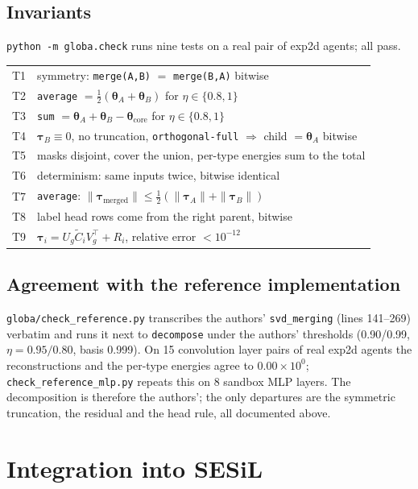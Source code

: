 \documentclass[11pt,a4paper]{article}
\newcommand{\tauv}{\boldsymbol{\tau}}
\newcommand{\thetav}{\boldsymbol{\theta}}
\newcommand{\Ug}{U_g}
\newcommand{\Vg}{V_g}
\newcommand{\Ct}{\tilde{C}}
\newcommand{\code}[1]{\texttt{#1}}
\begin{document}
\subsection{Invariants}
\code{python -m globa.check} runs nine tests on a real pair of exp2d agents; all pass.
\begin{center}\small
\begin{tabular}{ll}
\toprule
T1 & symmetry: \code{merge(A,B)} $=$ \code{merge(B,A)} bitwise \\
T2 & \code{average} $=\tfrac12(\thetav_A+\thetav_B)$ for $\eta\in\{0.8,1\}$ \\
T3 & \code{sum} $=\thetav_A+\thetav_B-\thetav_{\mathrm{core}}$ for $\eta\in\{0.8,1\}$ \\
T4 & $\tauv_B\equiv 0$, no truncation, \code{orthogonal-full} $\Rightarrow$ child $=\thetav_A$ bitwise \\
T5 & masks disjoint, cover the union, per-type energies sum to the total \\
T6 & determinism: same inputs twice, bitwise identical \\
T7 & \code{average}: $\|\tauv_{\mathrm{merged}}\|\le\tfrac12(\|\tauv_A\|+\|\tauv_B\|)$ \\
T8 & label head rows come from the right parent, bitwise \\
T9 & $\tauv_i=\Ug\Ct_i\Vg^{\top}+R_i$, relative error $<10^{-12}$ \\
\bottomrule
\end{tabular}
\end{center}

\subsection{Agreement with the reference implementation}
\code{globa/check\_reference.py} transcribes the authors' \code{svd\_merging} (lines 141--269) verbatim and runs it next to \code{decompose} under the authors' thresholds (0.90/0.99, $\eta=0.95/0.80$, basis 0.999). On 15 convolution layer pairs of real exp2d agents the reconstructions and the per-type energies agree to $0.00\times10^{0}$; \code{check\_reference\_mlp.py} repeats this on 8 sandbox MLP layers. The decomposition is therefore the authors'; the only departures are the symmetric truncation, the residual and the head rule, all documented above.

\section{Integration into SESiL}
\label{sec:integration}
\end{document}
